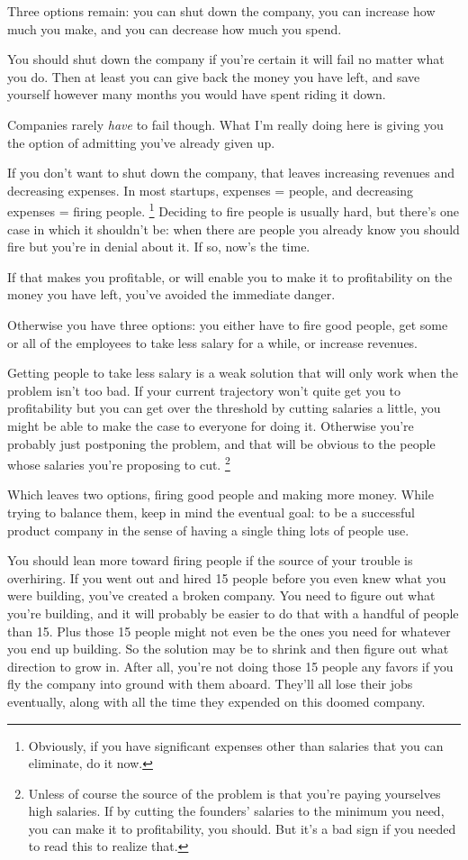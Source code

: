 \documentclass[12pt]{book}
\begin{document}
Three options remain: you can shut down the company, you can increase
how much you make, and you can decrease how much you spend.

You should shut down the company if you're certain it will fail no
matter what you do. Then at least you can give back the money you have
left, and save yourself however many months you would have spent riding
it down.

Companies rarely \emph{have} to fail though. What I'm really doing here
is giving you the option of admitting you've already given up.

If you don't want to shut down the company, that leaves increasing
revenues and decreasing expenses. In most startups, expenses = people,
and decreasing expenses = firing people. \footnote{Obviously, if you have significant expenses other than salaries
that you can eliminate, do it now.}
Deciding to fire people is usually hard, but there's one case in which
it shouldn't be: when there are people you already know you should fire
but you're in denial about it. If so, now's the time.

If that makes you profitable, or will enable you to make it to
profitability on the money you have left, you've avoided the immediate
danger.

Otherwise you have three options: you either have to fire good people,
get some or all of the employees to take less salary for a while, or
increase revenues.

Getting people to take less salary is a weak solution that will only
work when the problem isn't too bad. If your current trajectory won't
quite get you to profitability but you can get over the threshold by
cutting salaries a little, you might be able to make the case to
everyone for doing it. Otherwise you're probably just postponing the
problem, and that will be obvious to the people whose salaries you're
proposing to cut. \footnote{Unless of course the source of the problem is that you're paying
yourselves high salaries. If by cutting the founders' salaries to the
minimum you need, you can make it to profitability, you should. But it's
a bad sign if you needed to read this to realize that.}

Which leaves two options, firing good people and making more money.
While trying to balance them, keep in mind the eventual goal: to be a
successful product company in the sense of having a single thing lots of
people use.

You should lean more toward firing people if the source of your trouble
is overhiring. If you went out and hired 15 people before you even knew
what you were building, you've created a broken company. You need to
figure out what you're building, and it will probably be easier to do
that with a handful of people than 15. Plus those 15 people might not
even be the ones you need for whatever you end up building. So the
solution may be to shrink and then figure out what direction to grow in.
After all, you're not doing those 15 people any favors if you fly the
company into ground with them aboard. They'll all lose their jobs
eventually, along with all the time they expended on this doomed
company.
\end{document}
